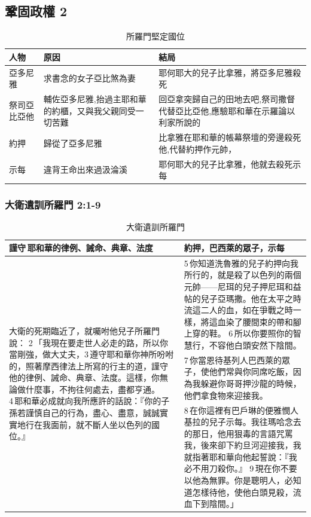 \subsection{鞏固政權 2} 
\begin{table}[H]
\centering
\begin{tabular}{p{1.5cm}|p{5cm}|p{10.5cm}}\hline\hline
  人物   &原因 & 結局  \\\hline\hline
亞多尼雅 & 求書念的女子亞比煞為妻 & 耶何耶大的兒子比拿雅，將亞多尼雅殺死 \\\hline
祭司亞比亞他& 輔佐亞多尼雅,抬過主耶和華的約櫃，又與我父親同受一切苦難&回亞拿突歸自己的田地去吧,祭司撒督代替亞比亞他,應驗耶和華在示羅論以利家所說的\\\hline
約押    & 歸從了亞多尼雅&比拿雅在耶和華的帳幕祭壇的旁邊殺死他,代替約押作元帥， \\\hline
示每&違背王命出來過汲淪溪&耶何耶大的兒子比拿雅，他就去殺死示每\\\hline
\end{tabular}
\caption{所羅門堅定國位}
\end{table}
\subsubsection{大衛遺訓所羅門 2:1-9} 
\begin{table}[H]
\centering
\begin{tabular}{p{6.5cm}|p{10.8cm}}\hline\hline
謹守 耶和華的律例、誡命、典章、法度&約押，巴西萊的眾子，示每 \\\hline\hline
\multirow{3}{6.67cm}{大衛的死期臨近了，就囑咐他兒子所羅門說： 2 「我現在要走世人必走的路，所以你當剛強，做大丈夫，3 遵守耶和華你神所吩咐的，照著摩西律法上所寫的行主的道，謹守他的律例、誡命、典章、法度。這樣，你無論做什麼事，不拘往何處去，盡都亨通。 4 耶和華必成就向我所應許的話說：『你的子孫若謹慎自己的行為，盡心、盡意，誠誠實實地行在我面前，就不斷人坐以色列的國位。』}&5 你知道洗魯雅的兒子約押向我所行的，就是殺了以色列的兩個元帥——尼珥的兒子押尼珥和益帖的兒子亞瑪撒。他在太平之時流這二人的血，如在爭戰之時一樣，將這血染了腰間束的帶和腳上穿的鞋。 6 所以你要照你的智慧行，不容他白頭安然下陰間。\\\cline{2-2}
 &7 你當恩待基列人巴西萊的眾子，使他們常與你同席吃飯，因為我躲避你哥哥押沙龍的時候，他們拿食物來迎接我。\\\cline{2-2}
&8 在你這裡有巴戶琳的便雅憫人基拉的兒子示每。我往瑪哈念去的那日，他用狠毒的言語咒罵我，後來卻下約旦河迎接我，我就指著耶和華向他起誓說：『我必不用刀殺你。』 9 現在你不要以他為無罪。你是聰明人，必知道怎樣待他，使他白頭見殺，流血下到陰間。」\\\hline
\end{tabular}
\caption{大衛遺訓所羅門}
\end{table}


